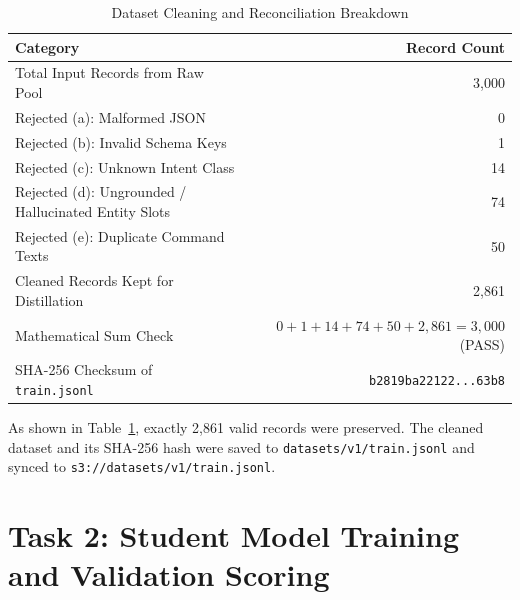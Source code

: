 \documentclass[10pt,a4paper]{article}
\begin{document}
\begin{table}[h]
\centering
\small
\caption{Dataset Cleaning and Reconciliation Breakdown}
\label{tab:cleaning_breakdown}
\begin{tabular}{|l|r|}
\hline
\textbf{Category} & \textbf{Record Count} \\
\hline
Total Input Records from Raw Pool & 3,000 \\
\hline
Rejected (a): Malformed JSON & 0 \\
\hline
Rejected (b): Invalid Schema Keys & 1 \\
\hline
Rejected (c): Unknown Intent Class & 14 \\
\hline
Rejected (d): Ungrounded / Hallucinated Entity Slots & 74 \\
\hline
Rejected (e): Duplicate Command Texts & 50 \\
\hline
Cleaned Records Kept for Distillation & 2,861 \\
\hline
Mathematical Sum Check & $0 + 1 + 14 + 74 + 50 + 2,861 = 3,000$ (PASS) \\
\hline
SHA-256 Checksum of \texttt{train.jsonl} & \texttt{b2819ba22122...63b8} \\
\hline
\end{tabular}
\end{table}

As shown in Table~\ref{tab:cleaning_breakdown}, exactly 2,861 valid records were preserved. The cleaned dataset and its SHA-256 hash were saved to \texttt{datasets/v1/train.jsonl} and synced to \texttt{s3://datasets/v1/train.jsonl}.

\section{Task 2: Student Model Training and Validation Scoring}
\end{document}
